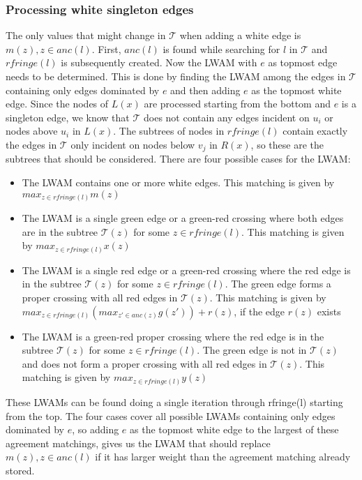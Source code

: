 \subsubsection{Processing white singleton edges}
The only values that might change in $\mathcal{T}$ when adding a white edge is $m(z), z \in anc(l)$. First, $anc(l)$ is found while searching for $l$ in $\mathcal{T}$ and $rfringe(l)$ is subsequently created. Now the LWAM with $e$ as topmost edge needs to be determined. This is done by finding the LWAM among the edges in $\mathcal{T}$ containing only edges dominated by $e$ and then adding $e$ as the topmost white edge. Since the nodes of $L(x)$ are processed starting from the bottom and $e$ is a singleton edge, we know that $\mathcal{T}$ does not contain any edges incident on $u_i$ or nodes above $u_i$ in $L(x)$. The subtrees of nodes in $rfringe(l)$ contain exactly the edges in $\mathcal{T}$ only incident on nodes below $v_j$ in $R(x)$, so these are the subtrees that should be considered. %
There are four possible cases for the LWAM:
\begin{itemize}
	\item The LWAM contains one or more white edges.
	\subitem This matching is given by $max_{z \in rfringe(l)} m(z)$
	\item The LWAM is a single green edge or a green-red crossing where both edges are in the subtree $\mathcal{T}(z)$ for some $z \in rfringe(l)$.
	\subitem This matching is given by $max_{z \in rfringe(l)} x(z)$
	\item The LWAM is a single red edge or a green-red crossing where the red edge is in the subtree $\mathcal{T}(z)$ for some $z \in rfringe(l)$. The green edge forms a proper crossing with all red edges in $\mathcal{T}(z)$.
	\subitem This matching is given by
	\subsubitem $max_{z \in rfringe(l)} (max_{z' \in anc(z)} g(z')) + r(z)$, if the edge $r(z)$ exists
	\item The LWAM is a green-red proper crossing where the red edge is in the subtree $\mathcal{T}(z)$ for some $z \in rfringe(l)$. The green edge is not in $\mathcal{T}(z)$ and does not form a proper crossing with all red edges in $\mathcal{T}(z)$.
	This matching is given by $max_{z \in rfringe(l)} y(z)$
\end{itemize}

These LWAMs can be found doing a single iteration through rfringe(l) starting from the top. The four cases cover all possible LWAMs containing only edges dominated by $e$, so adding $e$ as the topmost white edge to the largest of these agreement matchings, gives us the LWAM that should replace $m(z), z \in anc(l)$ if it has larger weight than the agreement matching already stored.

